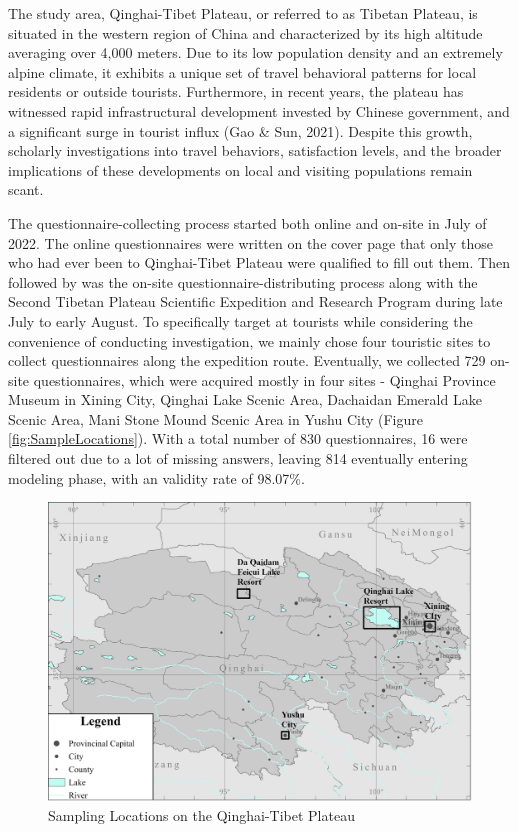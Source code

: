 \documentclass[
11pt, %
oneside, %
english, %
singlespacing, %
]{macthesis} %
\begin{document}
The study area, Qinghai-Tibet Plateau, or referred to as Tibetan Plateau, is situated in the western region of China and characterized by its high altitude averaging over 4,000 meters. Due to its low population density and an extremely alpine climate, it exhibits a unique set of travel behavioral patterns for local residents or outside tourists. Furthermore, in recent years, the plateau has witnessed rapid infrastructural development invested by Chinese government, and a significant surge in tourist influx (Gao \& Sun, 2021). Despite this growth, scholarly investigations into travel behaviors, satisfaction levels, and the broader implications of these developments on local and visiting populations remain scant.

The questionnaire-collecting process started both online and on-site in July of 2022. The online questionnaires were written on the cover page that only those who had ever been to Qinghai-Tibet Plateau were qualified to fill out them. Then followed by was the on-site questionnaire-distributing process along with the Second Tibetan Plateau Scientific Expedition and Research Program during late July to early August. To specifically target at tourists while considering the convenience of conducting investigation, we mainly chose four touristic sites to collect questionnaires along the expedition route. Eventually, we collected 729 on-site questionnaires, which were acquired mostly in four sites - Qinghai Province Museum in Xining City, Qinghai Lake Scenic Area, Dachaidan Emerald Lake Scenic Area, Mani Stone Mound Scenic Area in Yushu City (Figure \ref{fig:SampleLocations}). With a total number of 830 questionnaires, 16 were filtered out due to a lot of missing answers, leaving 814 eventually entering modeling phase, with an validity rate of 98.07\%.

\begin{figure}
\includegraphics[width=0.8\linewidth]{figure/SampleLocations} \caption{\label{fig:SampleLocations}Sampling Locations on the Qinghai-Tibet Plateau}\label{fig:fig1-sample-locations}
\end{figure}
\end{document}
